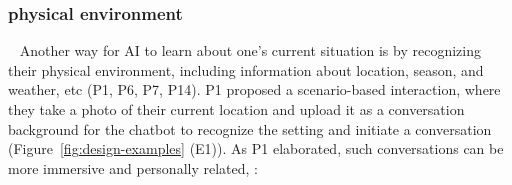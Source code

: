\subsubsection{ physical environment }~\label{physical env}
Another way for AI to learn about one's current situation is by recognizing their physical environment, including information about location, season, and weather, etc (P1, P6, P7, P14). 
 P1 proposed a scenario-based interaction, where they take a photo of their current location and upload it as a conversation background for the chatbot to recognize the setting and initiate a conversation (Figure~\ref{fig:design-examples} (E1)). As P1 elaborated, such conversations can be more immersive and personally related, : 

